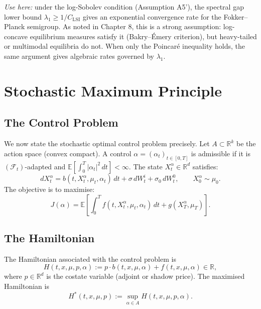 \noindent\textit{Use here:} under the log-Sobolev condition (Assumption A5'),
the spectral gap lower bound $\lambda_1 \ge 1/C_{\mathrm{LSI}}$ gives an
exponential convergence rate for the Fokker--Planck semigroup. As noted in
Chapter 8, this is a strong assumption: log-concave equilibrium measures satisfy
it (Bakry--\'Emery criterion), but heavy-tailed or multimodal equilibria do not.
When only the Poincar\'e inequality holds, the same argument gives algebraic rates
governed by $\lambda_1$.

\section{Stochastic Maximum Principle}
\label{sec:mp-smp}

\subsection{The Control Problem}

We now state the stochastic optimal control problem precisely. Let $A \subset
\mathbb{R}^k$ be the action space (convex compact). A control
$\alpha = (\alpha_t)_{t \in [0,T]}$ is admissible if it is $(\mathcal{F}_t)$-adapted
and $\mathbb{E}[\int_0^T |\alpha_t|^2\, dt] < \infty$. The state $X_t^\alpha \in
\mathbb{R}^d$ satisfies:
\begin{equation}
    dX_t^\alpha = b(t, X_t^\alpha, \mu_t, \alpha_t)\, dt + \sigma\, dW_t^i + \sigma_0\,
    dW_t^0, \qquad X_0^\alpha \sim \mu_0.
    \label{eq:smp-state}
\end{equation}
The objective is to maximise:
\begin{equation}
    J(\alpha) = \mathbb{E}\left[ \int_0^T f(t, X_t^\alpha, \mu_t, \alpha_t)\, dt +
    g(X_T^\alpha, \mu_T) \right].
    \label{eq:smp-objective}
\end{equation}

\subsection{The Hamiltonian}

\begin{definition}
The Hamiltonian associated with the control problem is
\begin{equation}
    H(t, x, \mu, p, \alpha) := p \cdot b(t,x,\mu,\alpha) + f(t,x,\mu,\alpha) \in
    \mathbb{R},
    \label{eq:hamiltonian-def}
\end{equation}
where $p \in \mathbb{R}^d$ is the costate variable (adjoint or shadow price). The
maximised Hamiltonian is
\[
    H^*(t,x,\mu,p) := \sup_{\alpha \in A} H(t,x,\mu,p,\alpha).
\]
\end{definition}

